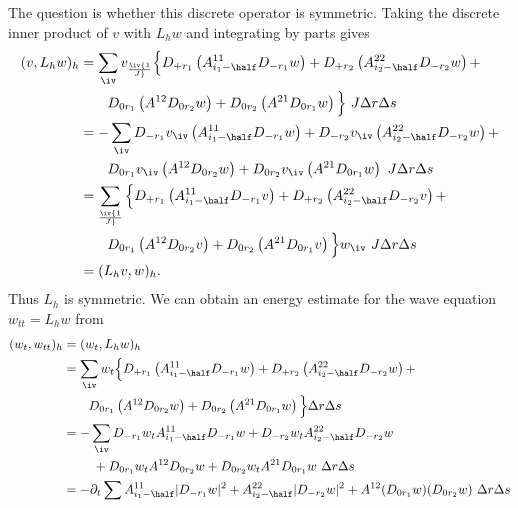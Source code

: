 \documentclass[10pt]{article}
\begin{document}
The question is whether this discrete operator is symmetric. Taking the discrete inner product of
$v$ with $L_h w$ and integrating by parts gives
\begin{align*}
 (v,L_h w)_h &= 
  \sum_\iv v_\iv {1\over J} \Big\lbrace
           D_{+ r_1}\left( A^{11}_{i_1-\half}D_{- r_1}w \right) +
           D_{+ r_2}\left( A^{22}_{i_2-\half}D_{- r_2}w \right) + \\
  &\qquad  D_{0 r_1}\left( A^{12}            D_{0 r_2}w \right) + 
           D_{0 r_2}\left( A^{21}            D_{0 r_1}w \right) \Big\rbrace  ~J \Delta r \Delta s \\
    &= - \sum_\iv D_{-r_1}v_\iv\left( A^{11}_{i_1-\half}D_{- r_1}w \right) +
                  D_{-r_2}v_\iv\left( A^{22}_{i_2-\half}D_{- r_2}w \right) + \\
  &\qquad  D_{0 r_1}v_\iv \left( A^{12}            D_{0 r_2}w \right) + 
           D_{0 r_2}v_\iv \left( A^{21}            D_{0 r_1}w \right)   ~J \Delta r \Delta s \\
  &= \sum_\iv  {1\over J} \Big\lbrace
           D_{+ r_1}\left( A^{11}_{i_1-\half}D_{- r_1}v \right) +
           D_{+ r_2}\left( A^{22}_{i_2-\half}D_{- r_2}v \right) + \\
  &\qquad  D_{0 r_1}\left( A^{12}            D_{0 r_2}v \right) + 
           D_{0 r_2}\left( A^{21}            D_{0 r_1}v \right) \Big\rbrace  w_\iv~J \Delta r \Delta s \\
      &= (L_h v, w)_h.
\end{align*}
Thus $L_h$ is symmetric. We can obtain an energy estimate for the wave equation $w_{tt}=L_h w$
from
\begin{align*}
 (w_t,w_{tt})_h &= (w_t,L_h w)_h \\
      &=  \sum_\iv w_t \Big\lbrace
           D_{+ r_1}\left( A^{11}_{i_1-\half}D_{- r_1}w \right) +
           D_{+ r_2}\left( A^{22}_{i_2-\half}D_{- r_2}w \right) + \\
  &\qquad  D_{0 r_1}\left( A^{12}            D_{0 r_2}w \right) + 
           D_{0 r_2}\left( A^{21}            D_{0 r_1}w \right) \Big\rbrace  \Delta r \Delta s \\
  &= -\sum_\iv  D_{- r_1} w_t  A^{11}_{i_1-\half} D_{- r_1}w 
              +D_{- r_2} w_t A^{22}_{i_2-\half}D_{- r_2} w   \\
    &~~~~~~~  +D_{0 r_1} w_t A^{12}            D_{0 r_2}w
              +D_{0 r_2} w_t A^{21}            D_{0 r_1}w  ~\Delta r \Delta s \\
  &= - \partial_t \sum A^{11}_{i_1-\half} |D_{- r_1} w|^2
                      +A^{22}_{i_2-\half} |D_{- r_2} w|^2
                      +A^{12} (D_{0 r_1} w)(D_{0 r_2} w) ~\Delta r \Delta s
\end{align*}
\end{document}
